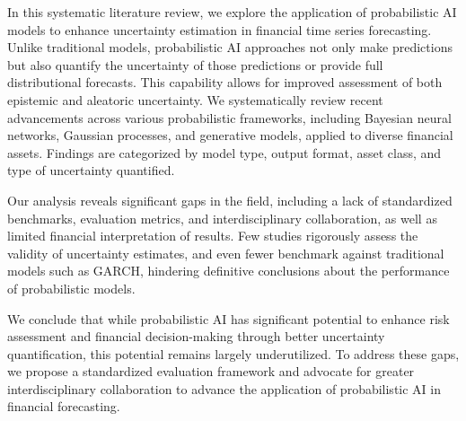 \label{sec:abstract}




\normalsize

In this systematic literature review, we explore the application of probabilistic AI models to enhance uncertainty estimation in financial time series forecasting. Unlike traditional models, probabilistic AI approaches not only make predictions but also quantify the uncertainty of those predictions or provide full distributional forecasts. This capability allows for improved assessment of both epistemic and aleatoric uncertainty. We systematically review recent advancements across various probabilistic frameworks, including Bayesian neural networks, Gaussian processes, and generative models, applied to diverse financial assets. Findings are categorized by model type, output format, asset class, and type of uncertainty quantified.

Our analysis reveals significant gaps in the field, including a lack of standardized benchmarks, evaluation metrics, and interdisciplinary collaboration, as well as limited financial interpretation of results. Few studies rigorously assess the validity of uncertainty estimates, and even fewer benchmark against traditional models such as GARCH, hindering definitive conclusions about the performance of probabilistic models.

We conclude that while probabilistic AI has significant potential to enhance risk assessment and financial decision-making through better uncertainty quantification, this potential remains largely underutilized. To address these gaps, we propose a standardized evaluation framework and advocate for greater interdisciplinary collaboration to advance the application of probabilistic AI in financial forecasting.